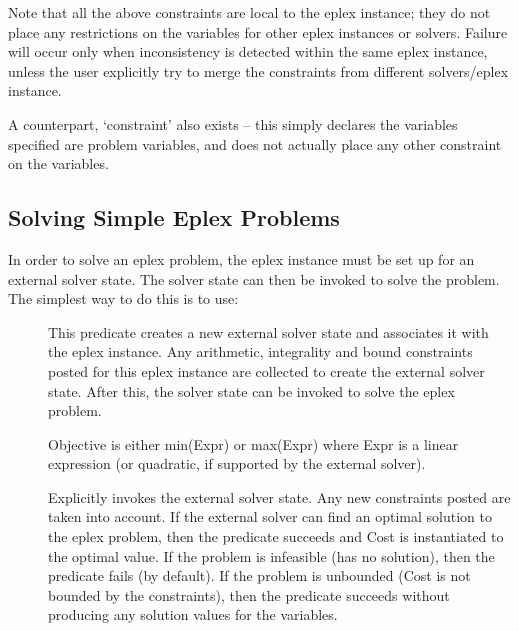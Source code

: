 Note that all the above constraints are local to the eplex instance; they
do not place any restrictions on the variables for other eplex instances or
solvers. Failure will occur only when inconsistency is detected within the
same eplex instance, unless the user explicitly try to merge the constraints
from different solvers/eplex instance.

A counterpart,  `constraint' also exists -- this simply declares the
variables specified are problem variables, and does not actually place any
other constraint on the variables.

\subsection{Solving Simple Eplex Problems}
\label{solving-eplex}
In order to solve an eplex problem, the eplex instance must be set up
for an external solver state. The solver state can then be invoked to
solve the problem. The simplest way to do this is to use:

\begin{description}
    \item[]
    This predicate creates a new external solver state and associates it
    with the eplex instance. Any arithmetic, integrality and bound
    constraints posted for this eplex instance are collected to create the
    external solver state. After this, the solver state can be invoked to 
    solve the eplex problem.

    Objective is either min(Expr) or max(Expr) where Expr is a linear
    expression (or quadratic, if supported by the external solver).  

    \item[]
    Explicitly invokes the external solver state. Any new constraints
    posted are taken into account. If the external solver can find an
    optimal solution to the eplex problem, then the predicate succeeds and Cost is
    instantiated to the optimal value. If the problem is infeasible (has no
    solution), then the predicate fails (by default). If the problem is
    unbounded (Cost is not bounded by the constraints), then the predicate
    succeeds without producing any solution values for the variables. 

\end{description}
